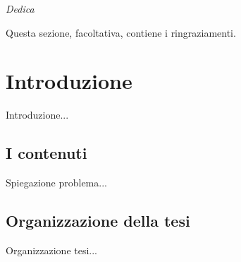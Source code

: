 \documentclass[12pt,italian]{report}
\begin{document}
\frontespizio
\beforepreface

% 
%

{\raggedleft \large \sl Dedica \\}
         
% 
%


%
%

Questa sezione, facoltativa, contiene i ringraziamenti.

%
%

\afterpreface

% 
% 

\chapter{Introduzione}
\label{cap:introduzione}

Introduzione...

\section{I contenuti}
\label{sec:contenuti}

Spiegazione problema...


\section{Organizzazione della tesi}
\label{sec:organizzazione}

Organizzazione tesi...

% 
% 
\end{document}
